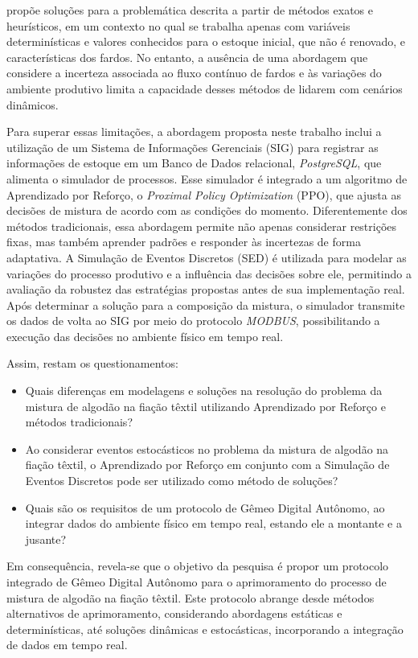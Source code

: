 \documentclass[
    12pt,                %
    openright,           %
    oneside,             %
    a4paper,             %
    english,             %
    spanish,             %
    brazil               %
]{ufscar}
\begin{document}
 propõe soluções para a problemática descrita a partir de métodos exatos e heurísticos, em um contexto no qual se trabalha apenas com variáveis determinísticas e valores conhecidos para o estoque inicial, que não é renovado, e características dos fardos. No entanto, a ausência de uma abordagem que considere a incerteza associada ao fluxo contínuo de fardos e às variações do ambiente produtivo limita a capacidade desses métodos de lidarem com cenários dinâmicos.

Para superar essas limitações, a abordagem proposta neste trabalho inclui a utilização de um Sistema de Informações Gerenciais (SIG) para registrar as informações de estoque em um Banco de Dados relacional, \textit{PostgreSQL}, que alimenta o simulador de processos. Esse simulador é integrado a um algoritmo de Aprendizado por Reforço, o \textit{Proximal Policy Optimization} (PPO), que ajusta as decisões de mistura de acordo com as condições do momento. Diferentemente dos métodos tradicionais, essa abordagem permite não apenas considerar restrições fixas, mas também aprender padrões e responder às incertezas de forma adaptativa. A Simulação de Eventos Discretos (SED) é utilizada para modelar as variações do processo produtivo e a influência das decisões sobre ele, permitindo a avaliação da robustez das estratégias propostas antes de sua implementação real. Após determinar a solução para a composição da mistura, o simulador transmite os dados de volta ao SIG por meio do protocolo \textit{MODBUS}, possibilitando a execução das decisões no ambiente físico em tempo real.

Assim, restam os questionamentos:

\begin{itemize}
    \item Quais diferenças em modelagens e soluções na resolução do problema da mistura de algodão na fiação têxtil utilizando Aprendizado por Reforço e métodos tradicionais?
    \item Ao considerar eventos estocásticos no problema da mistura de algodão na fiação têxtil, o Aprendizado por Reforço em conjunto com a Simulação de Eventos Discretos pode ser utilizado como método de soluções? 
    \item Quais são os requisitos de um protocolo de Gêmeo Digital Autônomo, ao integrar dados do ambiente físico em tempo real, estando ele a montante e a jusante?
\end{itemize}

Em consequência, revela-se que o objetivo da pesquisa é propor um protocolo integrado de Gêmeo Digital Autônomo para o aprimoramento do processo de mistura de algodão na fiação têxtil. Este protocolo abrange desde métodos alternativos de aprimoramento, considerando abordagens estáticas e determinísticas, até soluções dinâmicas e estocásticas, incorporando a integração de dados em tempo real.
\end{document}
